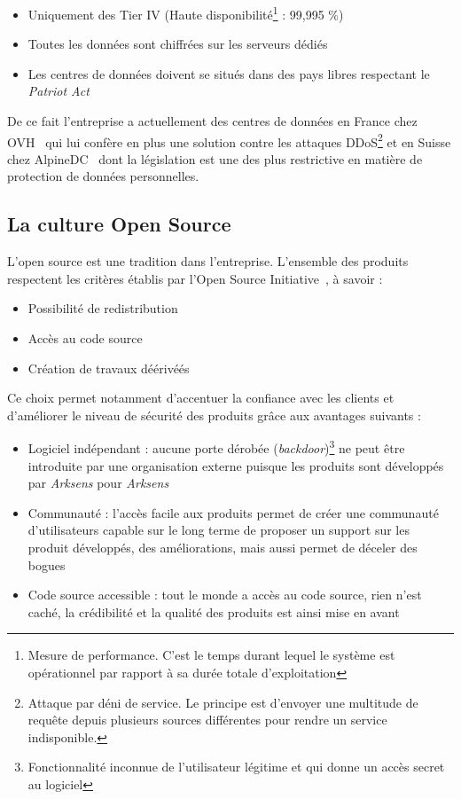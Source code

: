 \documentclass[a4paper,10pt, twoside]{report}
\begin{document}
\begin{spacing}{1.2}
\begin{itemize}
  \item Uniquement des Tier IV (Haute disponibilité\footnote{Mesure de
  performance. C'est le temps durant lequel le système est opérationnel par
  rapport à sa durée totale d'exploitation} : 99,995 \%)
  \item Toutes les données sont chiffrées sur les serveurs dédiés
  \item Les centres de données doivent se situés dans des pays libres
  respectant le \textit{Patriot Act}~\cite{refPatriotAct}
\end{itemize}

De ce fait l'entreprise a actuellement des centres de données en France
chez OVH~\cite{refOVH} qui lui confère en plus une solution contre les
attaques DDoS\footnote{Attaque par déni de service. Le principe est d'envoyer
une multitude de requête depuis plusieurs sources différentes pour rendre
un service indisponible.} et en Suisse chez AlpineDC~\cite{refAlpineDC} dont la
législation est une des plus restrictive en matière de protection de
données personnelles.

\subsection{La culture Open Source}

L'open source est une tradition dans l'entreprise. L'ensemble des
produits respectent les critères établis par l'Open Source
Initiative~\cite{refOSI}, à savoir :

\begin{itemize}
  \item Possibilité de redistribution
  \item Accès au code source
  \item Création de travaux déérivéés
\end{itemize}

Ce choix permet notamment d'accentuer la confiance avec les clients et
d'améliorer le niveau de sécurité des produits grâce aux avantages
suivants :

\begin{itemize}
  \item Logiciel indépendant : aucune porte dérobée
  (\textit{backdoor})\footnote{Fonctionnalité inconnue de l'utilisateur
  légitime et qui donne un accès secret au logiciel} ne peut
  être introduite par une organisation externe puisque les produits sont
  développés par \textit{Arksens} pour \textit{Arksens}
  \item Communauté : l'accès facile aux produits permet de créer une
  communauté d'utilisateurs capable sur le long terme de proposer un
  support sur les produit développés, des améliorations, mais aussi
  permet de déceler des bogues
  \item Code source accessible : tout le monde a accès au code source,
  rien n'est caché, la crédibilité et la qualité des produits est ainsi
  mise en avant
\end{itemize}


\end{spacing}
\end{document}
